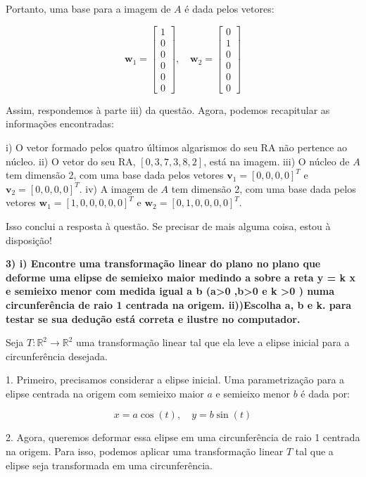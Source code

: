 Portanto, uma base para a imagem de \( A \) é dada pelos vetores:

\[ \mathbf{w}_1 = \begin{bmatrix} 1 \\ 0 \\ 0 \\ 0 \\ 0 \\ 0 \end{bmatrix}, \quad \mathbf{w}_2 = \begin{bmatrix} 0 \\ 1 \\ 0 \\ 0 \\ 0 \\ 0 \end{bmatrix} \]

Assim, respondemos à parte iii) da questão. Agora, podemos recapitular as informações encontradas:

i) O vetor formado pelos quatro últimos algarismos do seu RA não pertence ao núcleo.
ii) O vetor do seu RA, \( [0, 3, 7, 3, 8, 2] \), está na imagem.
iii) O núcleo de \( A \) tem dimensão 2, com uma base dada pelos vetores \( \mathbf{v}_1 = [0, 0, 0, 0]^T \) e \( \mathbf{v}_2 = [0, 0, 0, 0]^T \).
iv) A imagem de \( A \) tem dimensão 2, com uma base dada pelos vetores \( \mathbf{w}_1 = [1, 0, 0, 0, 0, 0]^T \) e \( \mathbf{w}_2 = [0, 1, 0, 0, 0, 0]^T \).

Isso conclui a resposta à questão. Se precisar de mais alguma coisa, estou à disposição!



\textbf{3)
i) Encontre uma transformação linear do plano no plano que deforme uma elipse de semieixo maior medindo a sobre a reta y = k x e semieixo menor com medida igual a b (a>0 ,b>0 e k >0 )
numa circunferência de raio 1 centrada na origem.
ii))Escolha a, b e k. para testar se sua dedução está correta e ilustre no computador.}

Seja \( T : \mathbb{R}^2 \rightarrow \mathbb{R}^2 \) uma transformação linear tal que ela leve a elipse inicial para a circunferência desejada.

1. Primeiro, precisamos considerar a elipse inicial. Uma parametrização para a elipse centrada na origem com semieixo maior \( a \) e semieixo menor \( b \) é dada por:

\[ x = a \cos(t), \quad y = b \sin(t) \]

2. Agora, queremos deformar essa elipse em uma circunferência de raio 1 centrada na origem. Para isso, podemos aplicar uma transformação linear \( T \) tal que a elipse seja transformada em uma circunferência.

